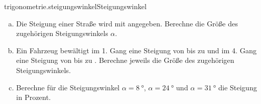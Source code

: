 \begin{exercise}{trigonometrie.steigungswinkel}{Steigungswinkel}
  \ifproblem\problem
    \begin{enumerate}[a)]
      \item Die Steigung einer Straße wird mit  angegeben. Berechne die Größe
            des zugehörigen Steigungswinkels $\alpha$.
      \item Ein Fahrzeug bewältigt im 1. Gang eine Steigung von bis zu  und
            im 4. Gang eine Steigung von bis zu . Berechne jeweils die Größe
            des zugehörigen Steigungswinkels.
      \item Berechne für die Steigungswinkel
            $\alpha=\SI{8}{\degree}$,
            $\alpha=\SI{24}{\degree}$ und
            $\alpha=\SI{31}{\degree}$
            die Steigung in Prozent.
    \end{enumerate}
  \fi
\end{exercise}
